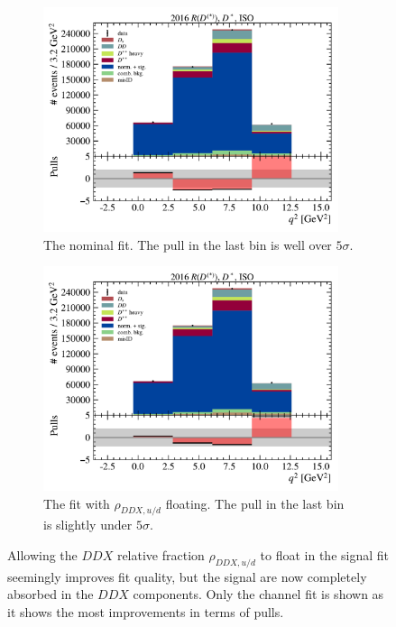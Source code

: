 \begin{figure}[!htb]
    \begin{subfigure}[t]{0.48\textwidth}
        \includegraphics[width=0.95\textwidth]{figs-fit/fit_uvsd/fit_result-stacked-Dst-iso-q2.pdf}
        \caption{
            The nominal fit.
            The pull in the last \qSq bin is well over $5 \sigma$.
        }
    \end{subfigure}%
    \hfill%
    \begin{subfigure}[t]{0.48\textwidth}
        \includegraphics[width=0.95\textwidth]{figs-fit/fit_uvsd/fit_result-stacked-Dst-iso-q2-floating_uvsd.pdf}
        \caption{
            The fit with $\rho_{DDX,u/d}$ floating.
            The pull in the last \qSq bin is slightly under $5 \sigma$.
        }
    \end{subfigure}

    \caption{
        Allowing the $DDX$ relative fraction $\rho_{DDX,u/d}$ to float in the
        signal fit seemingly improves fit quality,
        but the signal are now completely absorbed in the $DDX$ components.
        Only the \Dstar channel fit is shown as it shows the most improvements
        in terms of pulls.
    }
    \label{fig:fit-float-uvsd}
\end{figure}

